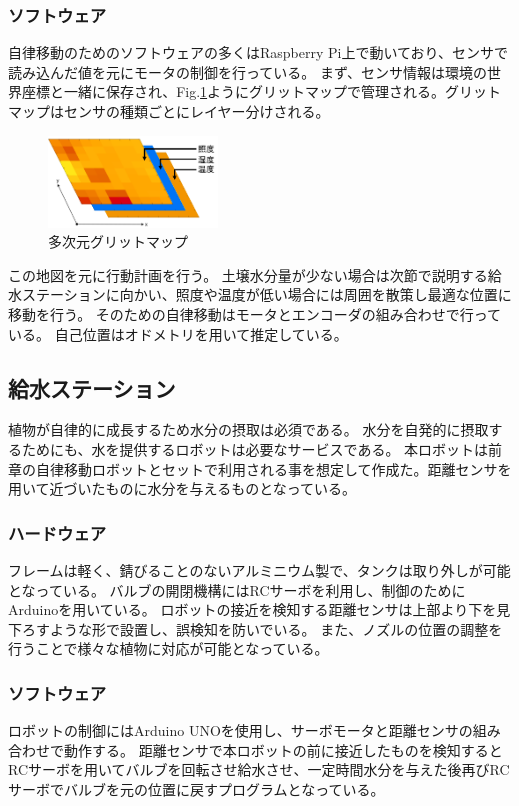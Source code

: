 \documentclass[10pt]{jsarticle}
\begin{document}
\subsubsection{ソフトウェア}
自律移動のためのソフトウェアの多くはRaspberry Pi上で動いており、センサで読み込んだ値を元にモータの制御を行っている。
まず、センサ情報は環境の世界座標と一緒に保存され、Fig.\ref{map}ようにグリットマップで管理される。グリットマップはセンサの種類ごとにレイヤー分けされる。
\begin{figure}[t]
    \centering
    \includegraphics[width=0.4\textwidth]{img/map_setumei.png}
    \caption{多次元グリットマップ}
    \label{map}
\end{figure}
この地図を元に行動計画を行う。
土壌水分量が少ない場合は次節で説明する給水ステーションに向かい、照度や温度が低い場合には周囲を散策し最適な位置に移動を行う。
そのための自律移動はモータとエンコーダの組み合わせで行っている。
自己位置はオドメトリを用いて推定している。

\subsection{給水ステーション}
植物が自律的に成長するため水分の摂取は必須である。
水分を自発的に摂取するためにも、水を提供するロボットは必要なサービスである。
本ロボットは前章の自律移動ロボットとセットで利用される事を想定して作成た。距離センサを用いて近づいたものに水分を与えるものとなっている。
\subsubsection{ハードウェア}
フレームは軽く、錆びることのないアルミニウム製で、タンクは取り外しが可能となっている。
バルブの開閉機構にはRCサーボを利用し、制御のためにArduinoを用いている。
ロボットの接近を検知する距離センサは上部より下を見下ろすような形で設置し、誤検知を防いでいる。
また、ノズルの位置の調整を行うことで様々な植物に対応が可能となっている。
\subsubsection{ソフトウェア}
ロボットの制御にはArduino UNOを使用し、サーボモータと距離センサの組み合わせで動作する。
距離センサで本ロボットの前に接近したものを検知するとRCサーボを用いてバルブを回転させ給水させ、一定時間水分を与えた後再びRCサーボでバルブを元の位置に戻すプログラムとなっている。
\end{document}
